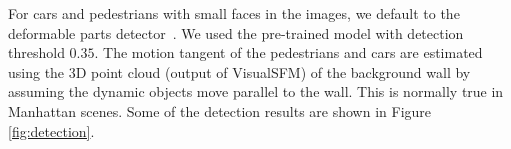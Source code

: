 For cars and pedestrians with small faces in the images, we default to the deformable parts
detector~\cite{lsvm-pami,voc-release5}. %
We used the pre-trained model with detection threshold $0.35$.
The motion tangent of the pedestrians and cars are estimated using the 3D point cloud (output of VisualSFM) of the background wall by assuming the dynamic objects move parallel to the wall. This is normally true in Manhattan scenes. Some of the detection results are shown in Figure \ref{fig:detection}.

